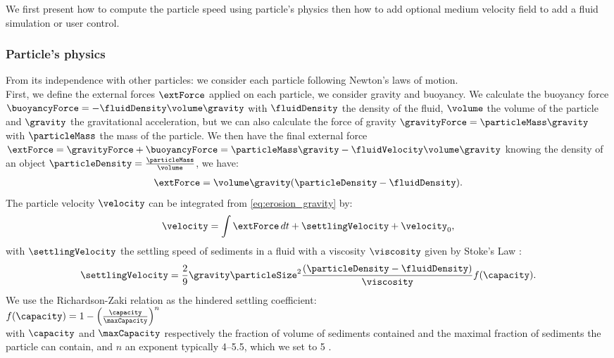 We first present how to compute the particle speed using particle's physics then how to add optional medium velocity field to add a fluid simulation or user control.

\subsubsection{Particle's physics}
From its independence with other particles: we consider each particle following Newton's laws of motion.\\
First, we define the external forces $\extForce$ applied on each particle, we consider gravity and buoyancy.
We calculate the buoyancy force $\buoyancyForce = -\fluidDensity \volume \gravity$ with $\fluidDensity$ the density of the fluid, $\volume$ the volume of the particle and $\gravity$ the gravitational acceleration, but we can also calculate the force of gravity $\gravityForce = \particleMass \gravity$ with $\particleMass$ the mass of the particle. We then have the final external force $\extForce = \gravityForce + \buoyancyForce = \particleMass \gravity - \fluidVelocity \volume \gravity$ knowing the density of an object $\particleDensity = \frac{\particleMass}{\volume}$, we have:
\begin{align} \label{eq:erosion_gravity}
\extForce = \volume \gravity (\particleDensity - \fluidDensity ).
\end{align}
The particle velocity $\velocity$ can be integrated from \eqref{eq:erosion_gravity} by: 
\begin{align} \label{eq:erosion_velocity-computation}
\velocity = \int{ \extForce \, dt} + \settlingVelocity + \velocity_0,
\end{align}
with $\settlingVelocity$ the settling speed of sediments in a fluid with a viscosity $\viscosity$ given by Stoke's Law \cite{Stokes1850}: 
\begin{align} \label{eq:erosion_initialSettlingVelocity}
\settlingVelocity = \frac{ 2 }{ 9 }  \gravity \particleSize^2 \frac{(\particleDensity - \fluidDensity)}{\viscosity } f(\capacity).
\end{align} 
We use the Richardson-Zaki relation as the hindered settling coefficient: \\
$f(\capacity) = 1 - \left( \frac{\capacity}{ \maxCapacity } \right)^{n}$ \\
with $\capacity$ and $\maxCapacity$ respectively the fraction of volume of sediments contained and the maximal fraction of sediments the particle can contain, and $n$ an exponent typically 4–5.5, which we set to 5 \cite{Richardson1954, Wojtan2007}.

